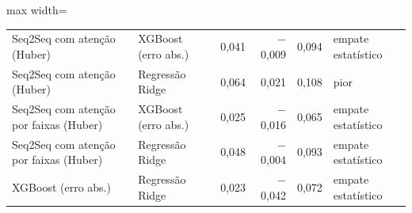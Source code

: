 \begin{table}[!htbp]
\begin{adjustbox}{max width=\textwidth}
\begin{tabular}{llrrrl}
        Seq2Seq com atenção (Huber) & XGBoost (erro abs.) & 0,041 & $-$0,009 & 0,094 & empate estatístico \\
        Seq2Seq com atenção (Huber) & Regressão Ridge & 0,064 & 0,021 & 0,108 & pior \\
        Seq2Seq com atenção por faixas (Huber) & XGBoost (erro abs.) & 0,025 & $-$0,016 & 0,065 & empate estatístico \\
        Seq2Seq com atenção por faixas (Huber) & Regressão Ridge & 0,048 & $-$0,004 & 0,093 & empate estatístico \\
        XGBoost (erro abs.) & Regressão Ridge & 0,023 & $-$0,042 & 0,072 & empate estatístico \\
        \bottomrule
    \end{tabular}
    \end{adjustbox}
\end{table}
